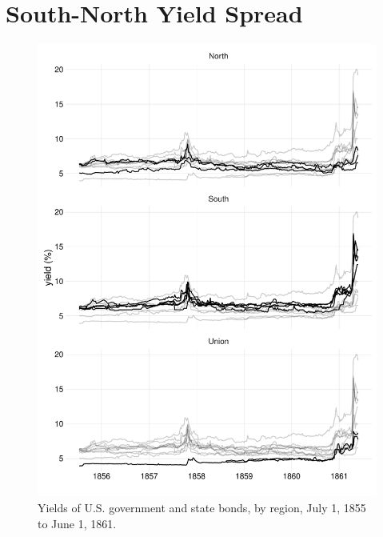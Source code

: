 \documentclass[]{article}\usepackage[]{graphicx}\usepackage[]{color}
\begin{document}
\section{South-North Yield Spread}
\label{sec:south-north-yield}


\begin{figure}
  \centering
  \includegraphics[width=\textwidth]{./figures/fig_yields_regions-1}
\caption{Yields of U.S. government and state bonds, by region, July  1, 1855 to June  1, 1861.}
\label{fig:yields_regions}
\end{figure}
\end{document}
